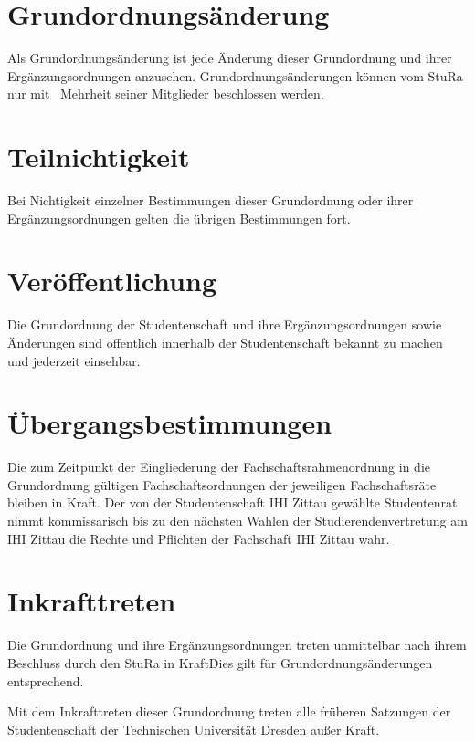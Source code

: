 \begin{multicols}{2}
\section{Grundordnungsänderung}

\Abs \Satz Als Grundordnungsänderung ist jede Änderung dieser Grundordnung und ihrer Ergänzungsordnungen anzusehen. Grundordnungsänderungen können vom StuRa nur mit ~Mehrheit seiner Mitglieder beschlossen werden.



\section{Teilnichtigkeit}

\Abs \Satz Bei Nichtigkeit einzelner Bestimmungen dieser Grundordnung oder ihrer Ergänzungsordnungen gelten die übrigen Bestimmungen fort.



\section{Veröffentlichung}

\Abs \Satz Die Grundordnung der Studentenschaft und ihre Ergänzungsordnungen sowie Änderungen sind öffentlich innerhalb der Studentenschaft bekannt zu machen und jederzeit einsehbar.



\section{Übergangsbestimmungen}

\Abs \Satz Die zum Zeitpunkt der Eingliederung der Fachschaftsrahmenordnung in die Grundordnung gültigen Fachschaftsordnungen der jeweiligen Fachschaftsräte bleiben in Kraft.
\Abs \Satz Der von der Studentenschaft IHI Zittau gewählte Studentenrat nimmt kommissarisch bis zu den nächsten Wahlen der Studierendenvertretung am IHI Zittau die Rechte und Pflichten der Fachschaft IHI Zittau wahr.


\section{Inkrafttreten}

\Abs \Satz Die Grundordnung und ihre Ergänzungsordnungen treten unmittelbar nach ihrem Beschluss durch den StuRa in Kraft\. Dies gilt für Grundordnungsänderungen entsprechend.

\Abs \Satz Mit dem Inkrafttreten dieser Grundordnung treten alle früheren Satzungen der Studentenschaft der Technischen Universität Dresden außer Kraft.

\end{multicols}

